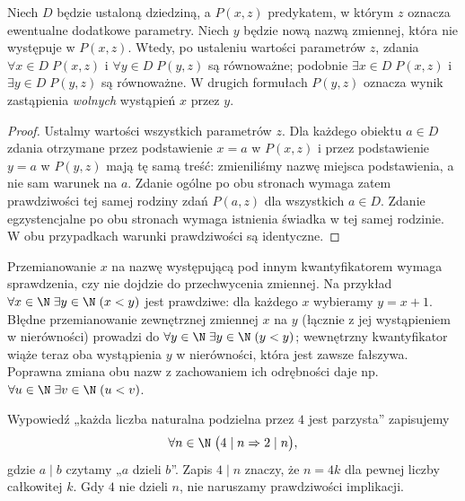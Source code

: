 \begin{twierdzenie}
\label{thm:alpha-renaming-xli}
Niech $D$ będzie ustaloną dziedziną, a $P(x,z)$
predykatem, w którym $z$ oznacza ewentualne dodatkowe
parametry. Niech $y$ będzie nową nazwą zmiennej,
która nie występuje w $P(x,z)$. Wtedy, po ustaleniu
wartości parametrów $z$, zdania
$\forall x\in D\;P(x,z)$ i
$\forall y\in D\;P(y,z)$ są równoważne; podobnie
$\exists x\in D\;P(x,z)$ i
$\exists y\in D\;P(y,z)$ są równoważne.
W drugich formułach $P(y,z)$ oznacza wynik zastąpienia
\emph{wolnych} wystąpień $x$ przez $y$.
\end{twierdzenie}
\begin{proof}
Ustalmy wartości wszystkich parametrów $z$.
Dla każdego obiektu $a\in D$ zdania otrzymane
przez podstawienie $x=a$ w $P(x,z)$ i przez
podstawienie $y=a$ w $P(y,z)$ mają tę samą treść:
zmieniliśmy nazwę miejsca podstawienia, a nie
sam warunek na $a$. Zdanie ogólne po obu stronach
wymaga zatem prawdziwości tej samej rodziny zdań
$P(a,z)$ dla wszystkich $a\in D$.
Zdanie egzystencjalne po obu stronach wymaga
istnienia świadka w tej samej rodzinie.
W obu przypadkach warunki prawdziwości są identyczne.
\end{proof}

\begin{przyklad}
\label{ex:variable-capture-xli}
Przemianowanie $x$ na nazwę występującą pod innym
kwantyfikatorem wymaga sprawdzenia, czy nie dojdzie
do przechwycenia zmiennej. Na przykład
$\forall x\in\N\;\exists y\in\N\;(x<y)$ jest prawdziwe:
dla każdego $x$ wybieramy $y=x+1$.
Błędne przemianowanie zewnętrznej zmiennej $x$ na $y$
(łącznie z jej wystąpieniem w nierówności) prowadzi do
$\forall y\in\N\;\exists y\in\N\;(y<y)$;
wewnętrzny kwantyfikator wiąże teraz oba wystąpienia
$y$ w nierówności, która jest zawsze fałszywa.
Poprawna zmiana obu nazw z zachowaniem ich odrębności
daje np.
$\forall u\in\N\;\exists v\in\N\;(u<v)$.
\end{przyklad}

\begin{przyklad}
Wypowiedź „każda liczba naturalna podzielna przez $4$
jest parzysta” zapisujemy
\[
\forall n\in\N\;\bigl(4\mid n\Rightarrow2\mid n\bigr),
\]
gdzie $a\mid b$ czytamy „$a$ dzieli $b$”.
Zapis $4\mid n$ znaczy, że $n=4k$ dla pewnej
liczby całkowitej $k$. Gdy $4$ nie dzieli $n$,
nie naruszamy prawdziwości implikacji.
\end{przyklad}

